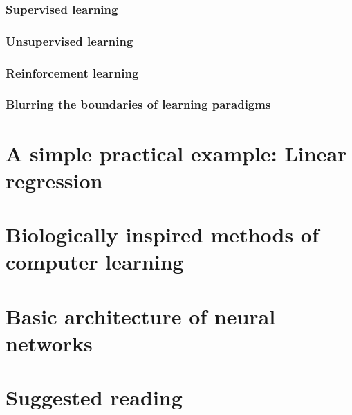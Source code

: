 \subsubsection{Supervised learning}

\subsubsection{Unsupervised learning}

\subsubsection{Reinforcement learning}

\subsubsection{Blurring the boundaries of learning paradigms}


\section{A simple practical example: Linear regression}


\section{Biologically inspired methods of computer learning}

\section{Basic architecture of neural networks}






\section{Suggested reading}




